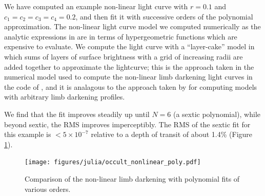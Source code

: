 \documentclass[modern]{aastex61}
\begin{document}

We have computed an example non-linear light curve with $r=0.1$ and
$c_1=c_2=c_3=c_4=0.2$, and then fit it with successive orders of the
polynomial approximation.  The non-linear light curve model
we computed numerically as the analytic expressions in \citet{MandelAgol2002}
are in terms of hypergeometric functions which are expensive to evaluate.
We compute the light curve with a ``layer-cake'' model in which sums of
layers of surface brightness with a grid of increasing radii are added together
to approximate the lightcurve;  this
is the approach taken in the numerical model used to compute the
non-linear limb darkening light curves in the code of \citet{MandelAgol2002},
and it is analagous to the approach taken by \citet{Kreidberg2015} for
computing models with arbitrary limb darkening profiles.

We find that the fit improves steadily up until $N=6$ (a sextic
polynomial), while beyond sextic, the RMS improves imperceptibly.
The RMS of the sextic fit for this example is $<5 \times 10^{-7}$
relative to a depth of transit of about 1.4\% (Figure \ref{fig:nonlinear}).

\begin{figure}
    \begin{centering}
    \texttt{[image: figures/julia/occult\_nonlinear\_poly.pdf]}
    \caption{Comparison of the non-linear limb darkening with polynomial
    fits of various orders.
    \label{fig:nonlinear}}
    \end{centering}
\end{figure}
\end{document}
